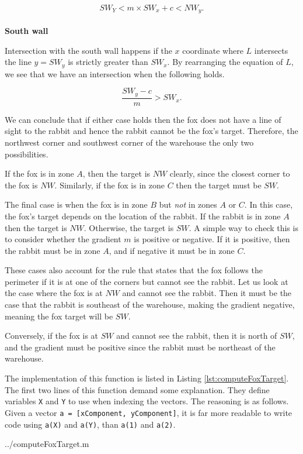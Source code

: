 $$ SW_Y < m \times SW_x + c < NW_y.$$\\

\noindent \textbf{South wall}

Intersection with the south wall happens if the $x$ coordinate where $L$ intersects the line $y = SW_y$ is strictly greater than $SW_x$. By rearranging the equation of $L$, we see that we have an intersection when the following holds.

$$ \frac{SW_y - c}{m} > SW_x. $$

We can conclude that if either case holds then the fox does not have a line of sight to the rabbit and hence the rabbit cannot be the fox's target. Therefore, the northwest corner and southwest corner of the warehouse the only two possibilities.

If the fox is in zone $A$, then the target is $NW$ clearly, since the closest corner to the fox is $NW$. Similarly, if the fox is in zone $C$ then the target must be $SW$. 

The final case is when the fox is in zone $B$ but \emph{not} in zones $A$ or $C$. In this case, the fox's target depends on the location of the rabbit. If the rabbit is in zone $A$ then the target is $NW$. Otherwise, the target is $SW$. A simple way to check this is to consider whether the gradient $m$ is positive or negative. If it is positive, then the rabbit must be in zone $A$, and if negative it must be in zone $C$.

These cases also account for the rule that states that the fox follows the perimeter if it is at one of the corners but cannot see the rabbit. Let us look at the case where the fox is at $NW$ and cannot see the rabbit. Then it must be the case that the rabbit is southeast of the warehouse, making the gradient negative, meaning the fox target will be $SW$.

Conversely, if the fox is at $SW$ and cannot see the rabbit, then it is north of $SW$, and the gradient must be positive since the rabbit must be northeast of the warehouse.

The implementation of this function is listed in Listing \ref{lst:computeFoxTarget}. The first two lines of this function demand some explanation. They define variables \texttt{X} and \texttt{Y} to use when indexing the vectors. The reasoning is as follows. Given a vector \texttt{a = [xComponent, yComponent]}, it is far more readable to write code using \texttt{a(X)} and \texttt{a(Y)}, than \texttt{a(1)} and \texttt{a(2)}.

  {../computeFoxTarget.m}